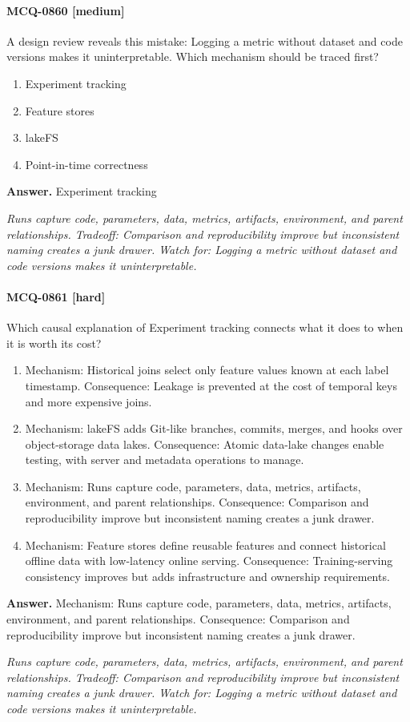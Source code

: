 \paragraph{MCQ-0860 [medium]} A design review reveals this mistake: Logging a metric without dataset and code versions makes it uninterpretable. Which mechanism should be traced first?
\begin{enumerate}[label=\Alph*.]
\item Experiment tracking
\item Feature stores
\item lakeFS
\item Point-in-time correctness
\end{enumerate}
\noindent\textbf{Answer.} Experiment tracking
\par\textit{Runs capture code, parameters, data, metrics, artifacts, environment, and parent relationships. Tradeoff: Comparison and reproducibility improve but inconsistent naming creates a junk drawer. Watch for: Logging a metric without dataset and code versions makes it uninterpretable.}
\paragraph{MCQ-0861 [hard]} Which causal explanation of Experiment tracking connects what it does to when it is worth its cost?
\begin{enumerate}[label=\Alph*.]
\item Mechanism: Historical joins select only feature values known at each label timestamp. Consequence: Leakage is prevented at the cost of temporal keys and more expensive joins.
\item Mechanism: lakeFS adds Git-like branches, commits, merges, and hooks over object-storage data lakes. Consequence: Atomic data-lake changes enable testing, with server and metadata operations to manage.
\item Mechanism: Runs capture code, parameters, data, metrics, artifacts, environment, and parent relationships. Consequence: Comparison and reproducibility improve but inconsistent naming creates a junk drawer.
\item Mechanism: Feature stores define reusable features and connect historical offline data with low-latency online serving. Consequence: Training-serving consistency improves but adds infrastructure and ownership requirements.
\end{enumerate}
\noindent\textbf{Answer.} Mechanism: Runs capture code, parameters, data, metrics, artifacts, environment, and parent relationships. Consequence: Comparison and reproducibility improve but inconsistent naming creates a junk drawer.
\par\textit{Runs capture code, parameters, data, metrics, artifacts, environment, and parent relationships. Tradeoff: Comparison and reproducibility improve but inconsistent naming creates a junk drawer. Watch for: Logging a metric without dataset and code versions makes it uninterpretable.}
